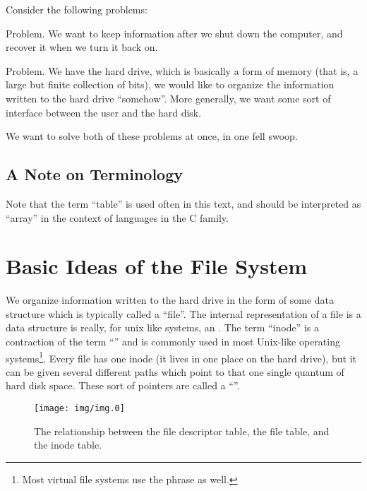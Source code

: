 
Consider the following problems:

\proclaim Problem. {We want to keep information after we shut
  down the computer, and recover it when we turn it back on.}

\proclaim Problem. {We have the hard drive, which is basically a
  form of memory (that is, a large but finite collection of
  bits), we would like to organize the information written to the
  hard drive ``somehow''. More generally, we want some sort of
  interface between the user and the hard disk.}

We want to solve both of these problems at once, in one fell
swoop.

\subsection{A Note on Terminology}

Note that the term ``table'' is used often in this text, and
should be interpreted as ``array'' in the context of languages in
the C family.

\section{Basic Ideas of the File System}

We organize information written to the hard drive in the form of
some data structure which is typically called a ``file''. The internal
representation of a file is a data structure is really, for unix
like systems, an . The term ``inode'' is a
contraction of the term ``'' and is commonly
used in most Unix-like operating systems\footnote{Most virtual
  file systems use the phrase as well.}. Every file has one inode
(it lives in one place on the hard drive), but it can be given several
different paths which point to that one single quantum of hard
disk space. These sort of pointers are called a ``''.

\begin{figure}[t]
\begin{center}
\texttt{[image: img/img.0]}
\vspace{-1.5pc}
\end{center}
\caption{The relationship between the file descriptor table, the
  file table, and the inode table.}\label{fig:img0}
\end{figure}

